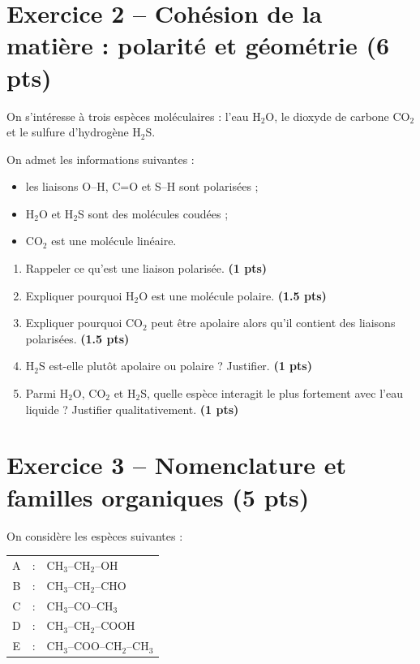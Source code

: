 \documentclass[11pt,a4paper]{article}
\newcommand{\pts}[1]{\hfill{\small\textbf{(#1 pts)}}}
\begin{document}
\section*{Exercice 2 -- Cohésion de la matière : polarité et géométrie \pts{6}}

On s'intéresse à trois espèces moléculaires : l'eau H$_2$O, le dioxyde de carbone CO$_2$ et le sulfure d'hydrogène H$_2$S.

On admet les informations suivantes :
\begin{itemize}[leftmargin=1.2em]
    \item les liaisons O--H, C=O et S--H sont polarisées ;
    \item H$_2$O et H$_2$S sont des molécules coudées ;
    \item CO$_2$ est une molécule linéaire.
\end{itemize}

\begin{enumerate}[label=\textbf{\arabic*.},leftmargin=1.2em]
    \item Rappeler ce qu'est une liaison polarisée. \pts{1}
    \item Expliquer pourquoi H$_2$O est une molécule polaire. \pts{1.5}
    \item Expliquer pourquoi CO$_2$ peut être apolaire alors qu'il contient des liaisons polarisées. \pts{1.5}
    \item H$_2$S est-elle plutôt apolaire ou polaire ? Justifier. \pts{1}
    \item Parmi H$_2$O, CO$_2$ et H$_2$S, quelle espèce interagit le plus fortement avec l'eau liquide ? Justifier qualitativement. \pts{1}
\end{enumerate}

\section*{Exercice 3 -- Nomenclature et familles organiques \pts{5}}

On considère les espèces suivantes :
\begin{center}
\begin{tabular}{ccl}
A & : & CH$_3$--CH$_2$--OH \\
B & : & CH$_3$--CH$_2$--CHO \\
C & : & CH$_3$--CO--CH$_3$ \\
D & : & CH$_3$--CH$_2$--COOH \\
E & : & CH$_3$--COO--CH$_2$--CH$_3$ \\
\end{tabular}
\end{center}
\end{document}
